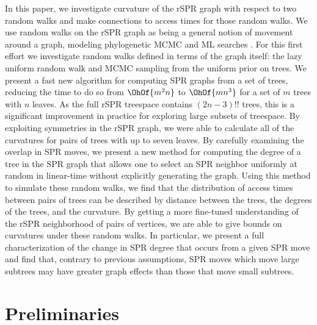 \documentclass[11pt,onecolumn,conference]{IEEEtran}
\begin{document}
In this paper, we investigate curvature of the rSPR graph with respect to two random walks and make connections to access times for those random walks.
We use random walks on the rSPR graph as being a general notion of movement around a graph, modeling phylogenetic MCMC and ML searches .
For this first effort we investigate random walks defined in terms of the graph itself: the lazy uniform random walk and MCMC sampling from the uniform prior on trees.
We present a fast new algorithm for computing SPR graphs from a set of trees, reducing the time to do so from $\OhOf{m^2n}$ to $\OhOf{mn^3}$ for a set of $m$ trees with $n$ leaves.
As the full rSPR treespace contains $(2n-3)!!$ trees, this is a significant improvement in practice for exploring large subsets of treespace.
By exploiting symmetries in the rSPR graph, we were able to calculate all of the curvatures for pairs of trees with up to seven leaves.
By carefully examining the overlap in SPR moves, we present a new method for computing the degree of a tree in the SPR graph that allows one to select an SPR neighbor uniformly at random in linear-time without explicitly generating the graph.
Using this method to simulate these random walks, we find that the distribution of access times between pairs of trees can be described by distance between the trees, the degrees of the trees, and the curvature.
By getting a more fine-tuned understanding of the rSPR neighborhood of pairs of vertices, we are able to give bounds on curvatures under these random walks.
In particular, we present a full characterization of the change in SPR degree that occurs from a given SPR move and find that, contrary to previous assumptions, SPR moves which move large subtrees may have greater graph effects than those that move small subtrees.


\section{Preliminaries}
\end{document}
